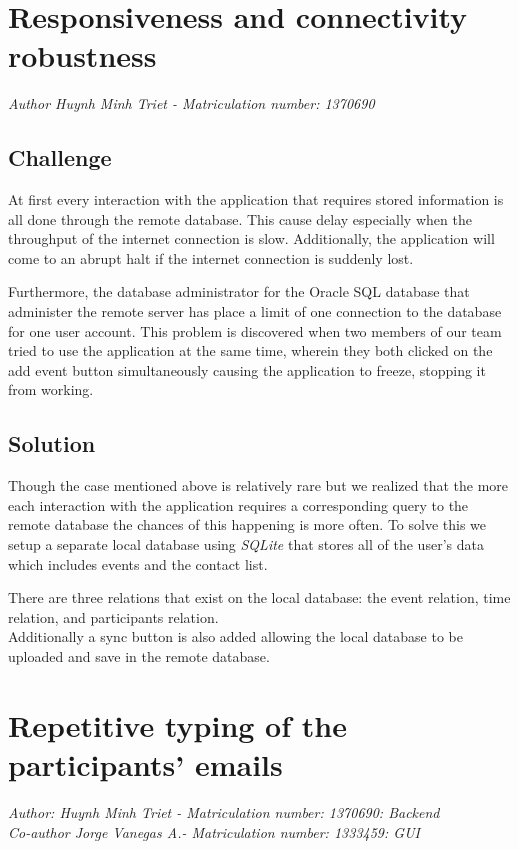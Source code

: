 \section{Responsiveness and connectivity robustness}
\emph{Author Huynh Minh Triet - Matriculation number: 1370690}

\subsection{Challenge}
At first every interaction with the application that requires stored information is all done through the remote 
database. This cause delay especially when the throughput of the internet connection is slow. Additionally,
the application will come to an abrupt halt if the internet connection is suddenly lost.

Furthermore, the database administrator for the Oracle SQL database that administer the remote server has place a limit 
of one connection to the database for one user account. This problem is discovered when two members of our team tried
to use the application at the same time, wherein they both clicked on the add event button simultaneously causing the 
application to freeze, stopping it from working.

\subsection{Solution}
Though the case mentioned above is relatively rare but we realized that the more each interaction with the application
requires a corresponding query to the remote database the chances of this happening is more often. To solve this
we setup a separate local database using \emph{SQLite} that stores all of the user's data which includes events
and the contact list.

There are three relations that exist on the local database: the event relation, time relation, and participants relation.\\

Additionally a sync button is also added allowing the local database to be uploaded and save in the 
remote database.

\section{Repetitive typing of the participants' emails}
\emph{Author: Huynh Minh Triet - Matriculation number: 1370690: Backend\\
        Co-author    Jorge Vanegas A.- Matriculation number: 1333459: GUI}
